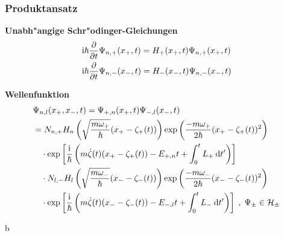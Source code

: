 \begin{frame}
  \frametitle{Produktansatz}
  \textbf{Unabh"angige Schr"odinger-Gleichungen}
  \begin{align}
    &\text i\hbar \frac{\partial}{\partial t} \Psi_{n,+}(x_+,t) = H_+(x_+,t)\Psi_{n,+}(x_+,t) \\\notag
    &\text i\hbar \frac{\partial}{\partial t} \Psi_{n,-}(x_-,t) = H_-(x_-,t)\Psi_{n,-}(x_-,t)
  \end{align}

  \textbf{Wellenfunktion}
  \begin{align}
     &\Psi_{n,l}(x_+,x_-,t) = \Psi_{+,n}(x_+,t)\Psi_{-,l}(x_-,t) \notag\\
     &=N_{n,+}H_n\left(\sqrt{\frac{m\omega_+}{\hbar}}(x_+-\zeta_+(t))\right) \exp\left(\frac{-m\omega_+}{2\hbar}(x_+-\zeta_+(t))^2\right)\notag\\
     &\quad \cdot \exp\left[\frac{\text i}{\hbar}\left(m\dot \zeta(t)(x_+-\zeta_+(t))-E_{+,n}t+\int_0^tL_+\:\text dt'\right)\right] \quad\quad\quad\notag\\
     &\quad \cdot N_{l,-}H_l\left(\sqrt{\frac{m\omega_-}{\hbar}}(x_--\zeta_-(t))\right) \exp\left(\frac{-m\omega_-}{2\hbar}(x_--\zeta_-(t))^2\right)\notag\\
     &\quad \cdot \exp\left[\frac{\text i}{\hbar}\left(m\dot \zeta(t)(x_--\zeta_-(t))-E_{-,l}t+\int_0^tL_-\:\text dt'\right)\right] \;,\; \Psi_\pm \in \cal H_\pm
   \end{align}

\end{frame}



























b
